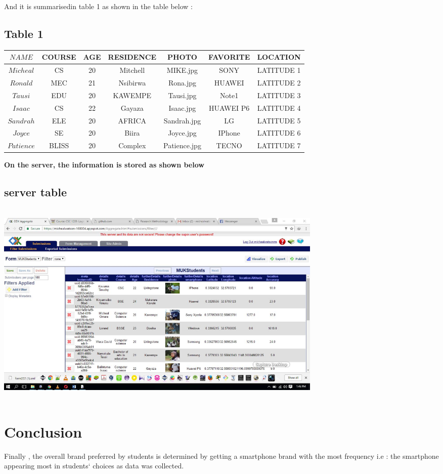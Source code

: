 \documentclass{article}
\begin{document}
And it is summarisedin table 1 as shown in the table below :
\subsection{Table 1}

\begin{tabular}{|c|c|c|c|c|c|c|}
	
	
\hline	$NAME$ & COURSE & AGE & RESIDENCE & PHOTO & FAVORITE & LOCATION \\ \hline
\hline	$ Micheal$ &  CS &20&Mitchell&MIKE.jpg&SONY &LATITUDE 1 \\ \hline
\hline	$ Ronald$ &  MEC &21&Nsibirwa&Rona.jpg&HUAWEI &LATITUDE 2 \\ \hline
\hline	$ Tausi$ &  EDU &20&KAWEMPE&Tausi.jpg&Note1 &LATITUDE 3\\ \hline
\hline	$ Isaac$ &  CS &22&Gayaza&Isaac.jpg&HUAWEI P6 &LATITUDE 4 \\ \hline
\hline	$ Sandrah$ &  ELE &20&AFRICA&Sandrah.jpg&LG &LATITUDE 5\\ \hline
\hline	$ Joyce$ &  SE &20&Biira&Joyce.jpg&IPhone &LATITUDE 6\\ \hline
\hline	$ Patience$ &  BLISS &20&Complex&Patience.jpg&TECNO &LATITUDE 7 \\ \hline

	
\end{tabular}

\textbf{On the server, the information is stored as shown below}

\subsection{server table}
\graphicspath{{ODKprojectReport/}}
\includegraphics[width = 16cm , height = 10cm ]{Screenshot1}




\section{Conclusion}
Finally , the overall brand preferred by students is determined by getting a smartphone brand with the most frequency i.e : the smartphone appearing most in students` choices as data was collected.
\end{document}
